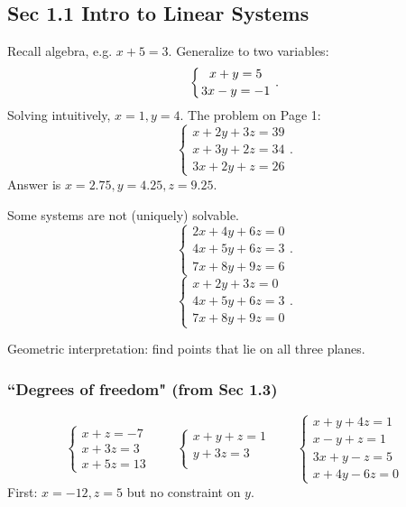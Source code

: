 \documentclass[12pt,a4paper]{article}
\renewcommand{\l}{\left}
\renewcommand{\r}{\right}
\begin{document}
\subsection*{Sec 1.1 Intro to Linear Systems}

Recall algebra, e.g. $x + 5 = 3$. Generalize to two variables:
\begin{equation*}
	\l\{{x+y= 5 \atop 3x-y = -1}\r..
\end{equation*}
Solving intuitively, $x = 1, y = 4$. The problem on Page 1:
\begin{equation}\label{sample3x3}
	\l\{
		\begin{array}{c}
			x+2y+3z = 39 \\
			x+3y+2z = 34 \\
			3x+2y+z = 26
		\end{array}
	\r..
\end{equation}
Answer is $x = 2.75, y = 4.25, z = 9.25$. 

\bigskip

Some systems are not (uniquely) solvable.
\begin{equation}\label{sample3x3nunique}
	\l\{
		\begin{array}{c}
			2x+4y+6z = 0 \\
			4x+5y+6z = 3 \\
			7x+8y+9z = 6
		\end{array}
	\r..
\end{equation}
\begin{equation}\label{sample3x3nsolvable}
	\l\{
		\begin{array}{c}
			x+2y+3z = 0 \\
			4x+5y+6z = 3 \\
			7x+8y+9z = 0
		\end{array}
	\r..
\end{equation}

\bigskip

Geometric interpretation: find points that lie on all three planes.

\subsubsection*{``Degrees of freedom" (from Sec 1.3)} 
\begin{equation*}
	\l\{
		\begin{array}{c}
			x+z = -7 \\
			x+3z = 3 \\
			x+5z = 13
		\end{array}
	\r. \qquad
	\l\{
		\begin{array}{c}
			x+y+z = 1 \\
			y+3z = 3 \\
		\end{array}
	\r. \qquad
	\l\{
		\begin{array}{c}
			x+y+4z = 1 \\
			x-y+z = 1 \\
			3x+y-z = 5 \\
			x+4y-6z = 0
		\end{array}
	\r.
\end{equation*}
First: $x = -12, z = 5$ but no constraint on $y$. 
\end{document}
